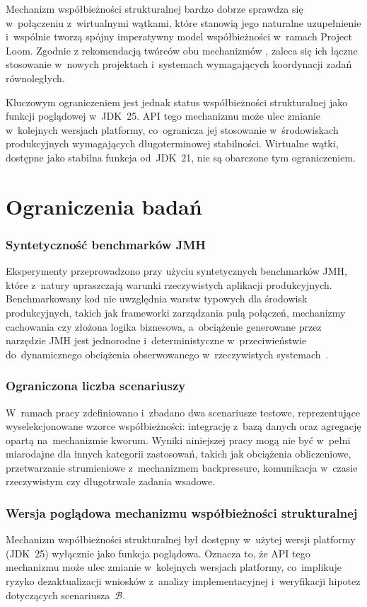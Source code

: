 Mechanizm współbieżności strukturalnej bardzo dobrze sprawdza się w~połączeniu z~wirtualnymi wątkami, które stanowią jego naturalne uzupełnienie i~wspólnie tworzą spójny imperatywny model współbieżności w~ramach Project Loom. Zgodnie z rekomendacją twórców obu mechanizmów \cite{jep444,jep525}, zaleca się ich łączne stosowanie w~nowych projektach i~systemach wymagających koordynacji zadań równoległych.

Kluczowym ograniczeniem jest jednak status współbieżności strukturalnej jako funkcji poglądowej w~JDK~25. API tego mechanizmu może ulec zmianie w~kolejnych wersjach platformy, co~ogranicza jej stosowanie w~środowiskach produkcyjnych wymagających długoterminowej stabilności. Wirtualne wątki, dostępne jako stabilna funkcja od~JDK~21, nie są obarczone tym ograniczeniem.

\section{Ograniczenia badań}

\subsubsection{Syntetyczność benchmarków JMH}
Eksperymenty przeprowadzono przy użyciu syntetycznych benchmarków JMH, które z~natury upraszczają warunki rzeczywistych aplikacji produkcyjnych. Benchmarkowany kod nie uwzględnia warstw typowych dla środowisk produkcyjnych, takich jak frameworki zarządzania pulą połączeń, mechanizmy cachowania czy złożona logika biznesowa, a~obciążenie generowane przez narzędzie JMH jest jednorodne i~deterministyczne w~przeciwieństwie do~dynamicznego obciążenia obserwowanego w~rzeczywistych systemach~\cite{jmh-documentation}.

\subsubsection{Ograniczona liczba scenariuszy}
W~ramach pracy zdefiniowano i~zbadano dwa scenariusze testowe, reprezentujące wyselekcjonowane wzorce współbieżności: integrację z~bazą danych oraz agregację opartą na~mechanizmie kworum. Wyniki niniejszej pracy mogą nie być w~pełni miarodajne dla innych kategorii zastosowań, takich jak obciążenia obliczeniowe, przetwarzanie strumieniowe z~mechanizmem backpressure, komunikacja w~czasie rzeczywistym czy długotrwałe zadania wsadowe.

\subsubsection{Wersja poglądowa mechanizmu współbieżności strukturalnej}
Mechanizm współbieżności strukturalnej był dostępny w~użytej wersji platformy (JDK~25) wyłącznie jako funkcja poglądowa. Oznacza to, że API tego mechanizmu może ulec zmianie w~kolejnych wersjach platformy, co~implikuje ryzyko dezaktualizacji wniosków z~analizy implementacyjnej i~weryfikacji hipotez dotyczących scenariusza~$\mathcal{B}$.


